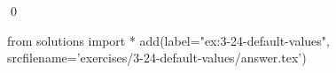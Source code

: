 
\begin{ex}
  \label{ex:3-24-default-values}
  
  \qed
\end{ex}
\begin{python0}
from solutions import *
add(label="ex:3-24-default-values",
    srcfilename='exercises/3-24-default-values/answer.tex')
\end{python0}
